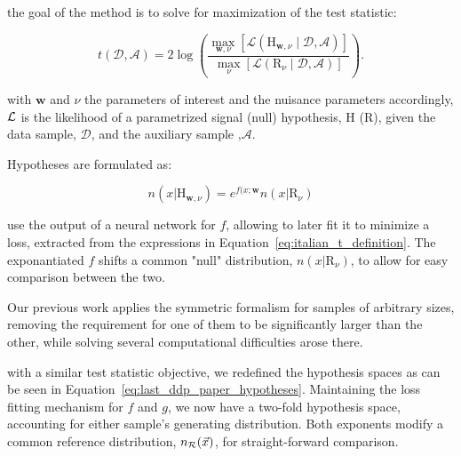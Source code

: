 \documentclass[thesis/Elad_Kliger_Thesis.tex]{subfiles}
\begin{document}
the goal of the method is to solve for maximization of the test statistic:

\begin{equation}
\label{eq:italian_t_definition}
    t(\mathcal{D}, \mathcal{A})
    =
    2 \log \left(
    \frac{
        \displaystyle \max_{\mathbf{w},\nu}
        \left[
            \mathcal{L}
            \left(
                \mathrm{H}_{\mathbf{w},\nu}
                \mid
                \mathcal{D},\mathcal{A}
            \right)
        \right]
    }{
        \displaystyle \max_{\nu}
        \left[
            \mathcal{L}
            \left(
                \mathrm{R}_{\nu}
                \mid
                \mathcal{D},\mathcal{A}
            \right)
        \right]
    } \right) .
\end{equation}

with $\mathbf{w}$ and $\nu$ the parameters of interest and the nuisance parameters accordingly, $\mathcal{L}$ is the likelihood of a parametrized signal (null) hypothesis, $\mathrm{H}$ ($\mathrm{R}$), given the data sample, $\mathcal{D}$, and the auxiliary sample ,$\mathcal{A}$.

Hypotheses are formulated as:

\begin{equation}
    n(x|\mathrm{H}_{\mathbf{w}, \nu}) = e^{f(x;\mathbf{w}}n(x|\mathrm{R}_\nu)
\end{equation}

\noindent use the output of a neural network for $f$, allowing to later fit it to minimize a loss, extracted from the expressions in Equation~\ref{eq:italian_t_definition}. The exponantiated $f$ shifts a common "null" distribution, $n(x|\mathrm{R}_\nu)$, to allow for easy comparison between the two.

Our previous work \cite{LastDDPPaper} applies the symmetric formalism for samples of arbitrary sizes, removing the requirement for one of them to be significantly larger than the other, while solving several computational difficulties arose there.

with a similar test statistic objective, we redefined the hypothesis spaces as can be seen in Equation~\ref{eq:last_ddp_paper_hypotheses}. Maintaining the loss fitting mechanism for $f$ and $g$, we now have a two-fold hypothesis space, accounting for either sample's generating distribution. Both exponents modify a common reference distribution, $n_{\mathcal{R}}({\vec{{x}}})$, for straight-forward comparison.
\end{document}
